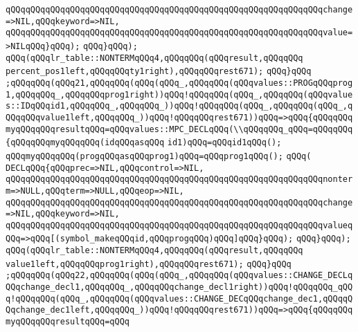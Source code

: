 \verb|qQQqqQQqqQQqqQQqqQQqqQQqqQQqqQQqqQQqqQQqqQQqqQQqqQQqqQQqqQQqqQQqchange=>NIL,qQQqkeyword=>NIL,|\newline
\verb|qQQqqQQqqQQqqQQqqQQqqQQqqQQqqQQqqQQqqQQqqQQqqQQqqQQqqQQqqQQqqQQqvalue=>NILqQQq}qQQq);|\newline
\verb|qQQq}qQQq);|\newline
\verb|qQQq(qQQqlr_table::NONTERMqQQq4,qQQqqQQq(qQQqresult,qQQqqQQq|\newline
\verb|percent_pos1left,qQQqqQQqty1right),qQQqqQQqrest671);|\newline
\verb|qQQq}qQQq|\newline
\verb|;qQQqqQQq(qQQq21,qQQqqQQq(qQQq(qQQq_,qQQqqQQq(qQQqvalues::PROGqQQqprog1,qQQqqQQq_,qQQqqQQqprog1right))qQQq!qQQqqQQq(qQQq_,qQQqqQQq(qQQqvalues::IDqQQqid1,qQQqqQQq_,qQQqqQQq_))qQQq!qQQqqQQq(qQQq_,qQQqqQQq(qQQq_,qQQqqQQqvalue1left,qQQqqQQq_))qQQq!qQQqqQQqrest671))qQQq=>qQQq{qQQqqQQqmyqQQqqQQqresultqQQq=qQQqvalues::MPC_DECLqQQq(\\qQQqqQQq_qQQq=qQQqqQQq{qQQqqQQqmyqQQqqQQq(idqQQqasqQQq|\newline
\verb|id1)qQQq=qQQqid1qQQq();|\newline
\verb|qQQqmyqQQqqQQq(progqQQqasqQQqprog1)qQQq=qQQqprog1qQQq();|\newline
\verb|qQQq(|\newline
\verb|DECLqQQq{qQQqprec=>NIL,qQQqcontrol=>NIL,|\newline
\verb|qQQqqQQqqQQqqQQqqQQqqQQqqQQqqQQqqQQqqQQqqQQqqQQqqQQqqQQqqQQqqQQqnonterm=>NULL,qQQqterm=>NULL,qQQqeop=>NIL,|\newline
\verb|qQQqqQQqqQQqqQQqqQQqqQQqqQQqqQQqqQQqqQQqqQQqqQQqqQQqqQQqqQQqqQQqchange=>NIL,qQQqkeyword=>NIL,|\newline
\verb|qQQqqQQqqQQqqQQqqQQqqQQqqQQqqQQqqQQqqQQqqQQqqQQqqQQqqQQqqQQqqQQqvalueqQQq=>qQQq[(symbol_makeqQQqid,qQQqprogqQQq)qQQq]qQQq}qQQq);|\newline
\verb|qQQq}qQQq);|\newline
\verb|qQQq(qQQqlr_table::NONTERMqQQq4,qQQqqQQq(qQQqresult,qQQqqQQq|\newline
\verb|value1left,qQQqqQQqprog1right),qQQqqQQqrest671);|\newline
\verb|qQQq}qQQq|\newline
\verb|;qQQqqQQq(qQQq22,qQQqqQQq(qQQq(qQQq_,qQQqqQQq(qQQqvalues::CHANGE_DECLqQQqchange_decl1,qQQqqQQq_,qQQqqQQqchange_decl1right))qQQq!qQQqqQQq_qQQq!qQQqqQQq(qQQq_,qQQqqQQq(qQQqvalues::CHANGE_DECqQQqchange_dec1,qQQqqQQqchange_dec1left,qQQqqQQq_))qQQq!qQQqqQQqrest671))qQQq=>qQQq{qQQqqQQqmyqQQqqQQqresultqQQq=qQQq|\newline
